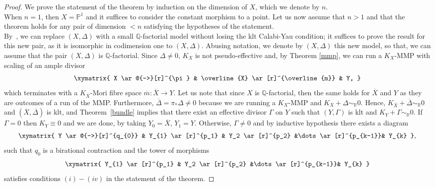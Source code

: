 \documentclass{amsart}[12pt,a4paper]
\theoremstyle{definition}
\newcommand{\qq}{\mathbb{Q}}
\begin{document}
\begin{proof}
We prove the statement of the theorem by induction on the dimension of $X$, which we denote by $n$.\\
When $n=1$, then $X=\mathbb{P}^1$ and it suffices to consider the constant morphism to a point.
Let us now assume that $n>1$ and that the theorem holds for any pair of dimension $<n$ satisfying the hypotheses of the statement.
\\
By~\cite[Corollary~1.37]{Kol13}, we can replace $(X,\Delta)$ with a small $\qq$-factorial model without losing the klt Calabi-Yau condition; it suffices to prove the result for this new pair, as it is isomorphic in codimension one to $(X, \Delta)$.
Abusing notation, we denote by $(X, \Delta)$ this new model, so that, we can assume that the pair $(X, \Delta)$ is $\mathbb{Q}$-factorial.
Since $\Delta \neq 0$, $K_{X}$ is not pseudo-effective and, by Theorem \ref{mmp}, we can run a $K_X$-MMP with scaling of an ample divisor
\begin{align}
\label{diag.3.2}
		\xymatrix{
			X \ar@{-->}[r]^{\pi} & \overline{X} \ar[r]^{\overline{m}} & Y,
		}
\end{align}		
which terminates with a $K_{\overline{X}}$-Mori fibre space $\overline{m} \colon \overline{X} \to Y$.
\newline
Let us note that since $X$ is $\mathbb{Q}$-factorial, then the same holds for $\overline{X}$ and $Y$ as they are outcomes of a run of the MMP.
Furthermore, $\overline{\Delta}=\pi_\ast \Delta \neq 0$ because we are running a $K_X$-MMP and $K_X +\Delta \sim_\mathbb{R} 0$.
Hence, $K_{\overline{X}}+\overline{\Delta} \sim_\mathbb{R} 0$ and $(\overline{X}, \overline{\Delta})$ is klt, and Theorem~\ref{bundle} implies that there exist an effective divisor $\Gamma$ on $Y$ such that $(Y, \Gamma)$ is klt and  $K_{Y} +\Gamma \sim_\mathbb{R} 0$.
\newline
If $\Gamma =0$ then $K_{Y} \equiv 0$ and we are done, by taking $Y_0=\overline{X}$, $Y_1=Y$. 	
Otherwise, $\Gamma \neq 0$ and by inductive hypothesis there exists a diagram
\begin{align*}
\xymatrix{
Y \ar@{-->}[r]^{q_{0}} & Y_{1} \ar[r]^{p_1} & Y_2 \ar[r]^{p_2} &\dots \ar[r]^{p_{k-1}}& Y_{k}
},
\end{align*}
such that $q_0$ is a birational contraction and the tower of morphisms 
\begin{align*}
\xymatrix{
Y_{1} \ar[r]^{p_1} & Y_2 \ar[r]^{p_2} &\dots \ar[r]^{p_{k-1}}& Y_{k}
}
\end{align*} 
satisfies conditions $(i)-(iv)$ in the statement of the theorem.

\end{proof}
\end{document}
